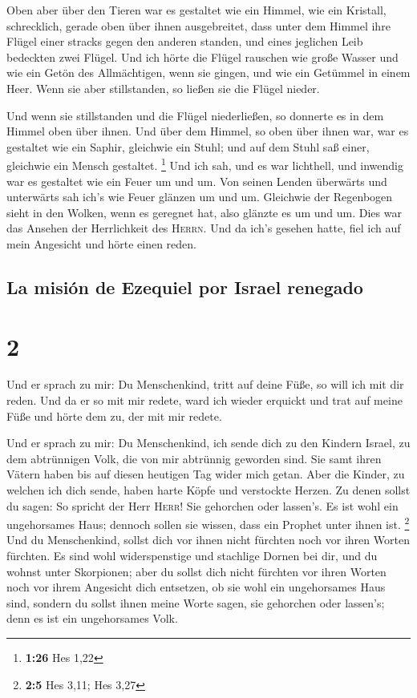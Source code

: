  Oben aber über den Tieren war es gestaltet wie ein
Himmel, wie ein Kristall, schrecklich, gerade oben über ihnen
ausgebreitet,  dass unter dem Himmel ihre Flügel einer
stracks gegen den anderen standen, und eines jeglichen Leib bedeckten
zwei Flügel.  Und ich hörte die Flügel rauschen wie große
Wasser und wie ein Getön des Allmächtigen, wenn sie gingen, und wie ein
Getümmel in einem Heer. Wenn sie aber stillstanden, so ließen sie die
Flügel nieder.

 Und wenn sie stillstanden und die Flügel niederließen,
so donnerte es in dem Himmel oben über ihnen.  Und über
dem Himmel, so oben über ihnen war, war es gestaltet wie ein Saphir,
gleichwie ein Stuhl; und auf dem Stuhl saß einer, gleichwie ein Mensch
gestaltet. \footnote{\textbf{1:26} Hes 1,22}  Und ich
sah, und es war lichthell, und inwendig war es gestaltet wie ein Feuer
um und um. Von seinen Lenden überwärts und unterwärts sah ich's wie
Feuer glänzen um und um.  Gleichwie der Regenbogen sieht
in den Wolken, wenn es geregnet hat, also glänzte es um und um. Dies war
das Ansehen der Herrlichkeit des \textsc{Herrn}. Und da ich's gesehen
hatte, fiel ich auf mein Angesicht und hörte einen reden.

\hypertarget{la-misiuxf3n-de-ezequiel-por-israel-renegado}{%
\subsection{La misión de Ezequiel por Israel
renegado}\label{la-misiuxf3n-de-ezequiel-por-israel-renegado}}

\hypertarget{section-1}{%
\section{2}\label{section-1}}

 Und er sprach zu mir: Du Menschenkind, tritt auf deine
Füße, so will ich mit dir reden.  Und da er so mit mir
redete, ward ich wieder erquickt und trat auf meine Füße und hörte dem
zu, der mit mir redete.

 Und er sprach zu mir: Du Menschenkind, ich sende dich zu
den Kindern Israel, zu dem abtrünnigen Volk, die von mir abtrünnig
geworden sind. Sie samt ihren Vätern haben bis auf diesen heutigen Tag
wider mich getan.  Aber die Kinder, zu welchen ich dich
sende, haben harte Köpfe und verstockte Herzen. Zu denen sollst du
sagen: So spricht der Herr \textsc{Herr}!  Sie gehorchen
oder lassen's. Es ist wohl ein ungehorsames Haus; dennoch sollen sie
wissen, dass ein Prophet unter ihnen ist. \footnote{\textbf{2:5} Hes
  3,11; Hes 3,27}  Und du Menschenkind, sollst dich vor
ihnen nicht fürchten noch vor ihren Worten fürchten. Es sind wohl
widerspenstige und stachlige Dornen bei dir, und du wohnst unter
Skorpionen; aber du sollst dich nicht fürchten vor ihren Worten noch vor
ihrem Angesicht dich entsetzen, ob sie wohl ein ungehorsames Haus sind,
 sondern du sollst ihnen meine Worte sagen, sie gehorchen
oder lassen's; denn es ist ein ungehorsames Volk.

